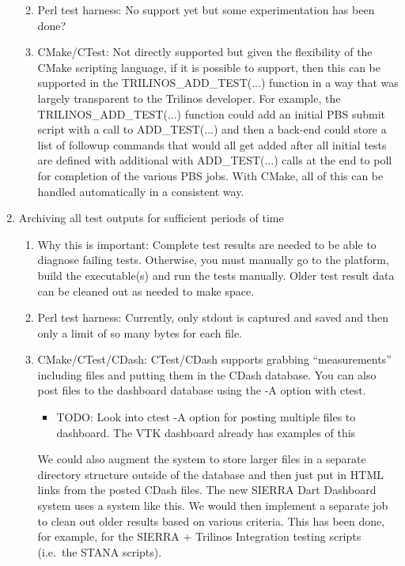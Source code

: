 \documentclass[pdf,ps2pdf,11pt]{SANDreport}
\begin{document}
\begin{enumerate}
\begin{enumerate}
  {}\item Perl test harness: No support yet but some experimentation
  has been done?

  {}\item CMake/CTest: Not directly supported but given the
  flexibility of the CMake scripting language, if it is possible to
  support, then this can be supported in the TRILINOS\_ADD\_TEST(...) 
  function in a way that was largely transparent to the Trilinos
  developer.  For example, the TRILINOS\_ADD\_TEST(...) function could
  add an initial PBS submit script with a call to ADD\_TEST(...) and
  then a back-end could store a list of followup commands that would
  all get added after all initial tests are defined with additional
  with ADD\_TEST(...) calls at the end to poll for completion of the
  various PBS jobs.  With CMake, all of this can be handled
  automatically in a consistent way.

  \end{enumerate}

{}\item Archiving all test outputs for sufficient periods of time

  \begin{enumerate}

  {}\item Why this is important: Complete test results are needed to
  be able to diagnose failing tests.  Otherwise, you must manually go
  to the platform, build the executable(s) and run the tests manually.
  Older test result data can be cleaned out as needed to make space.

  {}\item Perl test harness: Currently, only stdout is captured and
  saved and then only a limit of so many bytes for each file.

  {}\item CMake/CTest/CDash: CTest/CDash supports grabbing
  ``measurements'' including files and putting them in the CDash
  database.  You can also post files to the dashboard database using
  the -A option with ctest.

    \begin{itemize}

    {}\item TODO: Look into ctest -A option for posting multiple files
    to dashboard.  The VTK dashboard already has examples of this

    \end{itemize}

  We could also augment the system to store larger files in a separate
  directory structure outside of the database and then just put in
  HTML links from the posted CDash files.  The new SIERRA Dart
  Dashboard system uses a system like this.  We would then implement a
  separate job to clean out older results based on various criteria.
  This has been done, for example, for the SIERRA + Trilinos
  Integration testing scripts (i.e.\ the STANA scripts).


\end{enumerate}
\end{enumerate}
\end{document}

